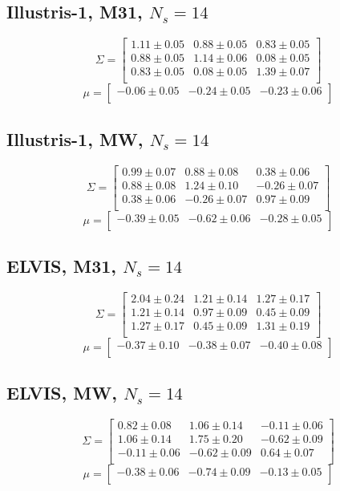 \documentclass[a4paper,fleqn,usenatbib]{mnras}
\begin{document}
\subsection{Illustris-1, M31, $N_s=14$}
\[
\Sigma=
\begin{bmatrix}
1.11 \pm 0.05 & 0.88 \pm 0.05 & 0.83 \pm 0.05\\
0.88 \pm 0.05 & 1.14 \pm 0.06 & 0.08 \pm 0.05\\
0.83 \pm 0.05 & 0.08 \pm 0.05 & 1.39 \pm 0.07\\
\end{bmatrix}
\]
\[
\mu=
\begin{bmatrix}
-0.06 \pm 0.05 & -0.24 \pm 0.05 & -0.23 \pm 0.06\\
\end{bmatrix}
\]
\subsection{Illustris-1, MW, $N_s=14$}
\[
\Sigma=
\begin{bmatrix}
0.99 \pm 0.07 & 0.88 \pm 0.08 & 0.38 \pm 0.06\\
0.88 \pm 0.08 & 1.24 \pm 0.10 & -0.26 \pm 0.07\\
0.38 \pm 0.06 & -0.26 \pm 0.07 & 0.97 \pm 0.09\\
\end{bmatrix}
\]
\[
\mu=
\begin{bmatrix}
-0.39 \pm 0.05 & -0.62 \pm 0.06 & -0.28 \pm 0.05\\
\end{bmatrix}
\]

\subsection{ELVIS, M31, $N_s=14$}
\[
\Sigma=
\begin{bmatrix}
2.04 \pm 0.24 & 1.21 \pm 0.14 & 1.27 \pm 0.17\\
1.21 \pm 0.14 & 0.97 \pm 0.09 & 0.45 \pm 0.09\\
1.27 \pm 0.17 & 0.45 \pm 0.09 & 1.31 \pm 0.19\\
\end{bmatrix}
\]
\[
\mu=
\begin{bmatrix}
-0.37 \pm 0.10 & -0.38 \pm 0.07 & -0.40 \pm 0.08\\
\end{bmatrix}
\]
\subsection{ELVIS, MW, $N_s=14$}
\[
\Sigma=
\begin{bmatrix}
0.82 \pm 0.08 & 1.06 \pm 0.14 & -0.11 \pm 0.06\\
1.06 \pm 0.14 & 1.75 \pm 0.20 & -0.62 \pm 0.09\\
-0.11 \pm 0.06 & -0.62 \pm 0.09 & 0.64 \pm 0.07\\
\end{bmatrix}
\]
\[
\mu=
\begin{bmatrix}
-0.38 \pm 0.06 & -0.74 \pm 0.09 & -0.13 \pm 0.05\\
\end{bmatrix}
\]
\end{document}
